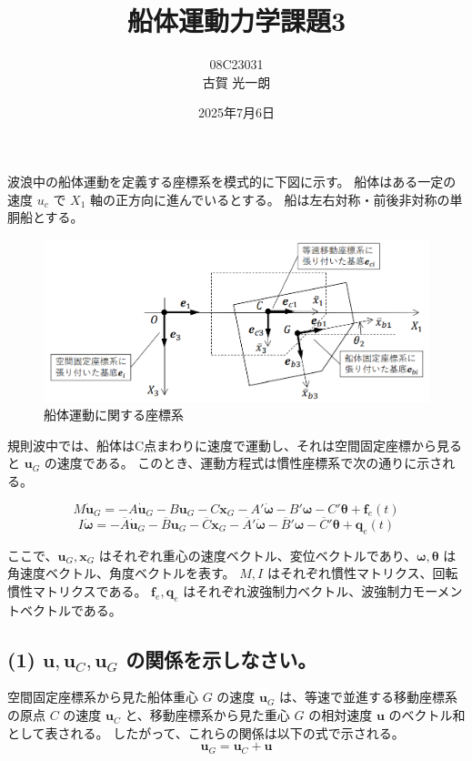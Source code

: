 \documentclass[dvipdfmx,a4paper]{jsarticle}
\title{船体運動力学課題3}
\author{08C23031 \\ 古賀 光一朗}
\date{2025年7月6日}
\begin{document}
\maketitle

波浪中の船体運動を定義する座標系を模式的に下図に示す。
船体はある一定の速度 $u_c$ で $X_1$ 軸の正方向に進んでいるとする。
船は左右対称・前後非対称の単胴船とする。

\begin{figure}[H]
    \centering
    \includegraphics[width=0.9\linewidth]{summer/ship-dynamics/day3/day3_01.png} 
    \caption{船体運動に関する座標系}
    \label{fig:coordinates}
\end{figure}

規則波中では、船体はC点まわりに速度で運動し、それは空間固定座標から見ると $\boldsymbol{u}_G$ の速度である。
このとき、運動方程式は慣性座標系で次の通りに示される。

$$ M\dot{\boldsymbol{u}}_G = -A\dot{\boldsymbol{u}}_G - B\boldsymbol{u}_G - C\boldsymbol{x}_G - A'\dot{\boldsymbol{\omega}} - B'\boldsymbol{\omega} - C'\boldsymbol{\theta} + \boldsymbol{f}_e(t) $$
$$ I\dot{\boldsymbol{\omega}} = -\overline{A}\dot{\boldsymbol{u}}_G - \overline{B}\boldsymbol{u}_G - \overline{C}\boldsymbol{x}_G - \overline{A}'\dot{\boldsymbol{\omega}} - \overline{B}'\boldsymbol{\omega} - \overline{C}'\boldsymbol{\theta} + \boldsymbol{q}_e(t) $$

ここで、$\boldsymbol{u}_G, \boldsymbol{x}_G$ はそれぞれ重心の速度ベクトル、変位ベクトルであり、$\boldsymbol{\omega}, \boldsymbol{\theta}$ は角速度ベクトル、角度ベクトルを表す。
$M, I$ はそれぞれ慣性マトリクス、回転慣性マトリクスである。
$\boldsymbol{f}_e, \boldsymbol{q}_e$ はそれぞれ波強制力ベクトル、波強制力モーメントベクトルである。

\subsection*{(1) $\boldsymbol{u}, \boldsymbol{u}_C, \boldsymbol{u}_G$ の関係を示しなさい。}
空間固定座標系から見た船体重心 $G$ の速度 $\boldsymbol{u}_G$ は、等速で並進する移動座標系の原点 $C$ の速度 $\boldsymbol{u}_C$ と、移動座標系から見た重心 $G$ の相対速度 $\boldsymbol{u}$ のベクトル和として表される。
したがって、これらの関係は以下の式で示される。
$$
\boldsymbol{u}_G = \boldsymbol{u}_C + \boldsymbol{u}
$$
\end{document}
